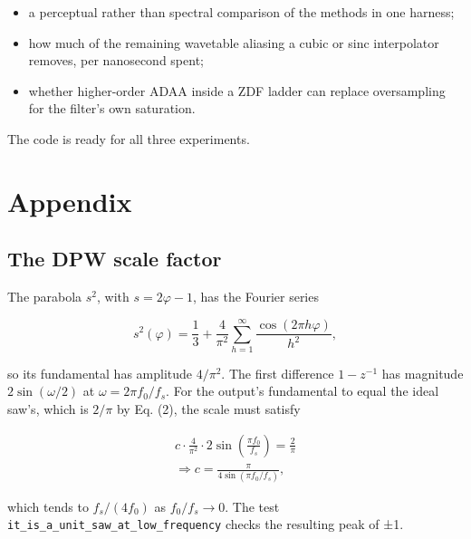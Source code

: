 \documentclass[conference]{IEEEtran}
\renewcommand{\thesection}{\arabic{section}}
\renewcommand{\thesubsection}{\thesection.\arabic{subsection}}
\begin{document}
\begin{itemize}
\item a perceptual rather than spectral comparison of the methods in one harness;
\item how much of the remaining wavetable aliasing a cubic or sinc interpolator removes, per nanosecond spent;
\item whether higher-order ADAA inside a ZDF ladder \cite{r3,r16} can replace oversampling for the filter's own saturation.
\end{itemize}

The code is ready for all three experiments.

\renewcommand{\thesubsection}{\Alph{subsection}}\renewcommand{\thesubsectiondis}{\Alph{subsection}.}
\setcounter{section}{5}
\section{Appendix}
\setcounter{subsection}{0}
\subsection{The DPW scale factor}
The parabola $s^2$, with $s = 2\varphi - 1$, has the Fourier series

\begin{equation*}
s^2(\varphi) = \frac{1}{3} + \frac{4}{\pi^2} \sum_{h=1}^{\infty} \frac{\cos(2\pi h\varphi)}{h^2},
\tag{A1}
\end{equation*}

so its fundamental has amplitude $4/\pi^2$. The first difference $1 - z^{-1}$ has magnitude $2\sin(\omega/2)$ at $\omega = 2\pi f_0/f_s$. For the output's fundamental to equal the ideal saw's, which is $2/\pi$ by Eq. (2), the scale must satisfy

\begin{equation*}
\begin{gathered}
c \cdot \frac{4}{\pi^2} \cdot 2 \sin\!\left(\frac{\pi f_0}{f_s}\right) = \frac{2}{\pi} \\
\Longrightarrow 
c = \frac{\pi}{4 \sin(\pi f_0 / f_s)},
\end{gathered}
\tag{A2}
\end{equation*}

which tends to $f_s/(4 f_0)$ \cite{r36} as $f_0/f_s \to 0$. The test \texttt{it\_\allowbreak{}is\_\allowbreak{}a\_\allowbreak{}unit\_\allowbreak{}saw\_\allowbreak{}at\_\allowbreak{}low\_\allowbreak{}frequency} checks the resulting peak of ±1.
\end{document}
